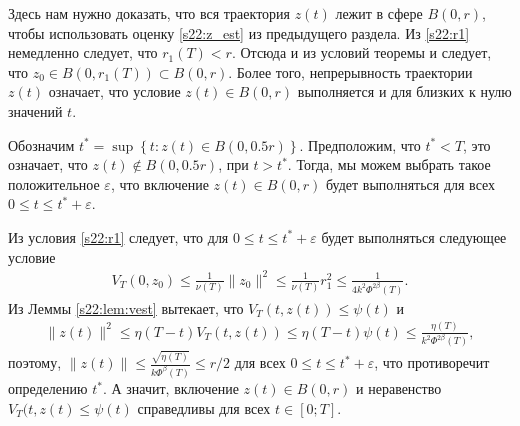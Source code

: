 \documentclass[../main.tex]{subfiles}
\begin{document}
Здесь нам нужно доказать, что вся траектория $z(t)$ лежит в сфере $B(0,r)$, чтобы использовать оценку \eqref{s22:z_est} из предыдущего раздела. 
Из \eqref{s22:r1} немедленно следует, что  $r_1(T) < r$. 
Отсюда и из условий теоремы и  следует, что $z_0 \in B(0,r_1(T)) \subset B(0,r) $. 
Более того, непрерывность траектории  $z(t)$ означает, что условие $z(t) \in B(0,r) $ выполняется и для близких к нулю значений  $t$.  

Обозначим $t^* = \sup \left\{ t: z(t) \in B\left(0,0.5r\right)\right\} $.
Предположим, что $t^* < T$, это означает, что  $z(t) \notin B(0,0.5r)$, при $t > t^*$. 
Тогда, мы можем выбрать такое положительное  $ \varepsilon$, что включение $z(t) \in B(0,r)$ будет выполняться для всех $0 \leqslant t \leqslant t^* + \varepsilon$. 

Из условия \eqref{s22:r1} следует, что для $0 \leqslant t \leqslant t^* + \varepsilon$ будет выполняться следующее условие
\begin{gather*}
    V_T(0,z_0) \leqslant \frac{1}{\nu(T)} \|z_0\|^2 \leqslant \frac{1}{\nu(T)} r_1^2 \leqslant \frac{1}{4k^2\Phi^{2\beta}(T)}.
\end{gather*}
Из Леммы \ref{s22:lem:vest} вытекает, что  
$V_T(t, z(t))  \leqslant \psi(t) $ и
\begin{gather}\label{s22:z_est}
    \|z(t)\|^2 \leqslant \eta(T-t) V_T(t,z(t)) \leqslant \eta(T-t) \psi(t) \leqslant  \frac{\eta(T)}{k^2\Phi^{2\beta}(T)},
\end{gather}
поэтому, $\|z(t)\| \leqslant \frac{\sqrt{\eta(T)}}{k\Phi^\beta(T)} \leqslant r/2$  для всех $0\leqslant t \leqslant t^*+\varepsilon$,
что противоречит определению $t^*$.  
А значит, включение $z(t) \in B(0,r) $  и неравенство  $V_T(t,z(t)\leqslant \psi(t)$ справедливы для всех $t \in [0; T]$.
        
\end{document}
